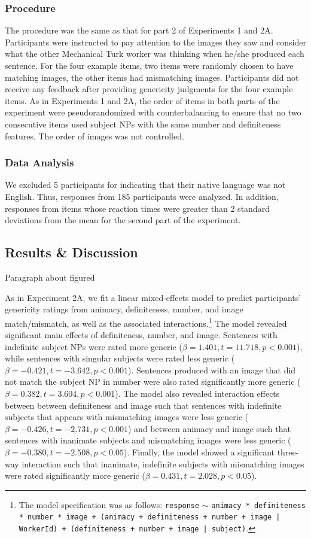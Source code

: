 \documentclass[10pt,letterpaper]{article}
\begin{document}
\subsubsection{Procedure} \quad The procedure was the same as that for part 2 of Experiments 1 and 2A. Participants were instructed to pay attention to the images they saw and consider what the other Mechanical Turk worker was thinking when he/she produced each sentence. For the four example items, two items were randomly chosen to have matching images, the other items had mismatching images. Participants did not receive any feedback after providing genericity judgments for the four example items. As in Experiments 1 and 2A, the order of items in both parts of the experiment were pseudorandomized with counterbalancing to ensure that no two consecutive items used subject NPs with the same number and definiteness features. The order of images was not controlled.

\subsubsection{Data Analysis} \quad We excluded 5 participants for indicating that their native language was not English. Thus, responses from 185 participants were analyzed. In addition, responses from items whose reaction times were greater than 2 standard deviations from the mean for the second part of the experiment.

\subsection{Results \& Discussion}

Paragraph about figured

As in Experiment 2A, we fit a linear mixed-effects model to predict participants' genericity ratings from animacy, definiteness, number, and image match/mismatch, as well as the associated interactions.\footnote{The model specification was as follows: \texttt{response} \(\sim\) \texttt{animacy * definiteness * number * image + (animacy + definiteness + number + image | WorkerId) + (definiteness + number + image | subject)}.} The model revealed significant main effects of definiteness, number, and image. Sentences with indefinite subject NPs were rated more generic (\(\beta = 1.401, t = 11.718, p < 0.001\)), while sentences with singular subjects were rated less generic (\(\beta = -0.421, t = -3.642, p < 0.001\)). Sentences produced with an image that did not match the subject NP in number were also rated significantly more generic (\(\beta = 0.382, t = 3.604, p < 0.001\)). The model also revealed interaction effects between between definiteness and image such that sentences with indefinite subjects that appears with mismatching images were less generic (\(\beta = -0.426, t = -2.731, p < 0.001\)) and between animacy and image such that sentences with inanimate subjects and mismatching images were less generic (\(\beta = -0.380, t=-2.508, p<0.05\)). Finally, the model showed a significant three-way interaction such that inanimate, indefinite subjects with mismatching images were rated significantly more generic (\(\beta = 0.431, t = 2.028, p < 0.05\)).
\end{document}
